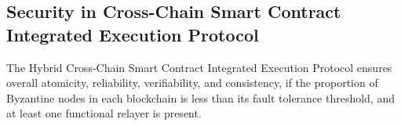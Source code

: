 \subsection{Security in Cross-Chain Smart Contract Integrated Execution Protocol}
\begin{theorem}
The Hybrid Cross-Chain Smart Contract Integrated Execution Protocol ensures overall atomicity, reliability, verifiability, and consistency, if the proportion of Byzantine nodes in each blockchain is less than its fault tolerance threshold, and at least one functional relayer is present.
\end{theorem}

